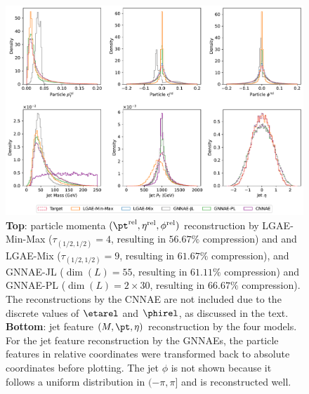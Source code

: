 \begin{figure}[ht!]
    \centering
    \includegraphics[width=\linewidth]{figures/06-ML4Jets/lgae/reconstructions/hist-cnnae.pdf}
    \caption[Particle and jet feature reconstruction by the LGAE, GNNAE, and CNNAE models.]{
        \textbf{Top}:
        particle momenta $(\pt^{\mathrm{rel}}, \eta^{\mathrm{rel}}, \phi^{\mathrm{rel}})$ reconstruction by
        LGAE-Min-Max ($\tau_{(1/2, 1/2)}=4$, resulting in $56.67\%$ compression) and
        and LGAE-Mix ($\tau_{(1/2, 1/2)}=9$, resulting in $61.67\%$ compression),
        and GNNAE-JL ($\dim(L) = 55$, resulting in $61.11\%$ compression) and
        GNNAE-PL ($\dim(L) = 2\times 30$, resulting in $66.67\%$ compression). The reconstructions by the CNNAE are not included due to the discrete values of $\etarel$ and $\phirel$, as discussed in the text. 
        \textbf{Bottom}:
        jet feature $(M, \pt, \eta)$ reconstruction by the four models.
        For the jet feature reconstruction by the GNNAEs, the particle features in relative coordinates were transformed back to absolute coordinates before plotting.
        The jet $\phi$ is not shown because it follows a uniform distribution in $(-\pi, \pi]$ and is reconstructed well.
    }
    \label{fig:06_lgae_recons-hist}
\end{figure}

